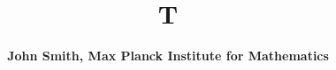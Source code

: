 \documentclass{amsart}
\begin{document}
\title{T}
\author{\textbf{John Smith, Max Planck Institute for Mathematics}}
\maketitle
\end{document}

